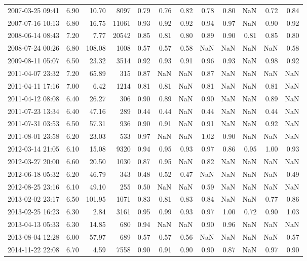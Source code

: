 \begin{table}
\begin{tabular}{lrrrrrrrrrrr}
2007-03-25 09:41 & 6.90 & 10.70 & 8097 & 0.79 & 0.76 & 0.82 & 0.78 & 0.80 & NaN & 0.72 & 0.84 \\
2007-07-16 10:13 & 6.80 & 16.75 & 11061 & 0.93 & 0.92 & 0.92 & 0.94 & 0.97 & NaN & 0.90 & 0.92 \\
2008-06-14 08:43 & 7.20 & 7.77 & 20542 & 0.85 & 0.81 & 0.80 & 0.89 & 0.90 & 0.81 & 0.85 & 0.80 \\
2008-07-24 00:26 & 6.80 & 108.08 & 1008 & 0.57 & 0.57 & 0.58 & NaN & NaN & NaN & NaN & 0.58 \\
2009-08-11 05:07 & 6.50 & 23.32 & 3514 & 0.92 & 0.93 & 0.91 & 0.96 & 0.93 & NaN & 0.98 & 0.92 \\
2011-04-07 23:32 & 7.20 & 65.89 & 315 & 0.87 & NaN & NaN & 0.87 & NaN & NaN & NaN & NaN \\
2011-04-11 17:16 & 7.00 & 6.42 & 1214 & 0.81 & 0.81 & NaN & 0.81 & NaN & NaN & 0.81 & NaN \\
2011-04-12 08:08 & 6.40 & 26.27 & 306 & 0.90 & 0.89 & NaN & 0.90 & NaN & NaN & 0.89 & NaN \\
2011-07-23 13:34 & 6.40 & 47.16 & 289 & 0.44 & 0.44 & NaN & 0.44 & NaN & NaN & 0.44 & NaN \\
2011-07-31 03:53 & 6.50 & 57.31 & 936 & 0.90 & 0.91 & NaN & 0.91 & NaN & NaN & 0.92 & NaN \\
2011-08-01 23:58 & 6.20 & 23.03 & 533 & 0.97 & NaN & NaN & 1.02 & 0.90 & NaN & NaN & NaN \\
2012-03-14 21:05 & 6.10 & 15.08 & 9320 & 0.94 & 0.95 & 0.93 & 0.97 & 0.86 & 0.95 & 1.00 & 0.93 \\
2012-03-27 20:00 & 6.60 & 20.50 & 1030 & 0.87 & 0.95 & NaN & 0.82 & NaN & NaN & NaN & NaN \\
2012-06-18 05:32 & 6.20 & 46.79 & 343 & 0.48 & 0.52 & 0.47 & NaN & NaN & NaN & NaN & 0.49 \\
2012-08-25 23:16 & 6.10 & 49.10 & 255 & 0.50 & NaN & NaN & 0.59 & NaN & NaN & NaN & NaN \\
2013-02-02 23:17 & 6.50 & 101.95 & 1071 & 0.83 & 0.81 & 0.83 & 0.84 & NaN & NaN & 0.77 & 0.86 \\
2013-02-25 16:23 & 6.30 & 2.84 & 3161 & 0.95 & 0.99 & 0.93 & 0.97 & 1.00 & 0.72 & 0.90 & 1.03 \\
2013-04-13 05:33 & 6.30 & 14.85 & 680 & 0.94 & NaN & NaN & 0.90 & 0.96 & NaN & NaN & NaN \\
2013-08-04 12:28 & 6.00 & 57.97 & 689 & 0.57 & 0.57 & 0.56 & NaN & NaN & NaN & NaN & 0.57 \\
2014-11-22 22:08 & 6.70 & 4.59 & 7558 & 0.90 & 0.91 & 0.90 & 0.90 & 0.87 & NaN & 0.97 & 0.90 \\

\end{tabular}
\end{table}
